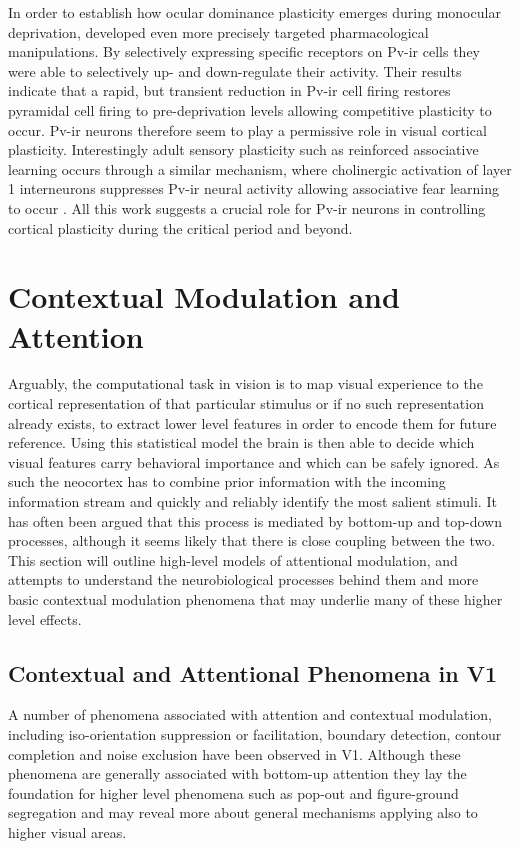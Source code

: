 In order to establish how ocular dominance plasticity emerges during
monocular deprivation, \cite{Kuhlman2013} developed even more
precisely targeted pharmacological manipulations. By selectively
expressing specific receptors on Pv-ir cells they were able to
selectively up- and down-regulate their activity. Their results
indicate that a rapid, but transient reduction in Pv-ir cell firing
restores pyramidal cell firing to pre-deprivation levels allowing
competitive plasticity to occur. Pv-ir neurons therefore seem to play
a permissive role in visual cortical plasticity. Interestingly adult
sensory plasticity such as reinforced associative learning occurs
through a similar mechanism, where cholinergic activation of layer 1
interneurons suppresses Pv-ir neural activity allowing associative
fear learning to occur \citep{Letzkus2011}. All this work suggests a
crucial role for Pv-ir neurons in controlling cortical plasticity
during the critical period and beyond.

\section{Contextual Modulation and Attention} \label{contextualmodulation}

Arguably, the computational task in vision is to map visual experience
to the cortical representation of that particular stimulus or if no
such representation already exists, to extract lower level features in
order to encode them for future reference. Using this statistical
model the brain is then able to decide which visual features carry
behavioral importance and which can be safely ignored. As such the
neocortex has to combine prior information with the incoming
information stream and quickly and reliably identify the most salient
stimuli. It has often been argued that this process is mediated by
bottom-up and top-down processes, although it seems likely that there
is close coupling between the two. This section will outline
high-level models of attentional modulation, and attempts to
understand the neurobiological processes behind them and more basic
contextual modulation phenomena that may underlie many of these higher
level effects.

\subsection{Contextual and Attentional Phenomena in V1}

A number of phenomena associated with attention and contextual
modulation, including iso-orientation suppression or facilitation,
boundary detection, contour completion and noise exclusion have been
observed in V1. Although these phenomena are generally associated with
bottom-up attention they lay the foundation for higher level phenomena
such as pop-out and figure-ground segregation and may reveal more
about general mechanisms applying also to higher visual areas.


